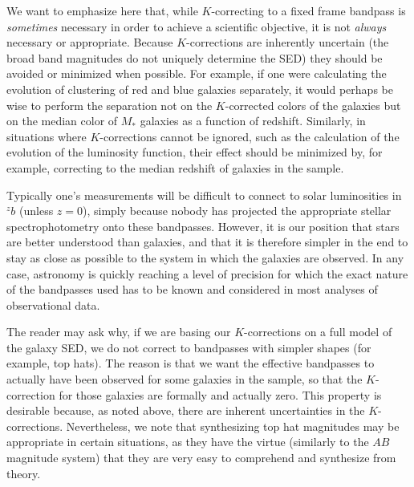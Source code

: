 \documentclass[10pt,preprint]{aastex}
\newcommand{\band}[2]{\ensuremath{^{#1}\!{#2}}}
\begin{document}
We want to emphasize here that, while $K$-correcting to a fixed frame
bandpass is {\it sometimes} necessary in order to achieve a scientific
objective, it is not {\it always} necessary or appropriate. Because
$K$-corrections are inherently uncertain (the broad band magnitudes
do not uniquely determine the SED) they should be avoided or
minimized when possible. For example, if one were calculating the
evolution of clustering of red and blue galaxies separately, it would
perhaps be wise to perform the separation not on the $K$-corrected
colors of the galaxies but on the median color of $M_\ast$
galaxies as a function of redshift. Similarly, in situations where
$K$-corrections cannot be ignored, such as the calculation of the
evolution of the luminosity function, their effect should be minimized
by, for example, correcting to the median redshift of galaxies in the
sample.

Typically one's measurements will be difficult to connect to solar
luminosities in $\band{z}{b}$ (unless $z=0$), simply because nobody
has projected the appropriate stellar spectrophotometry onto these
bandpasses. However, it is our position that stars are better
understood than galaxies, and that it is therefore simpler in the end
to stay as close as possible to the system in which the galaxies are
observed. In any case, astronomy is quickly reaching a level of
precision for which the exact nature of the bandpasses used has to be
known and considered in most analyses of observational data.

The reader may ask why, if we are basing our $K$-corrections on a full
model of the galaxy SED, we do not correct to bandpasses with simpler
shapes (for example, top hats). The reason is that we want the effective
bandpasses to actually have been observed for some galaxies in the
sample, so that the $K$-correction for those galaxies are formally and
actually zero. This property is desirable because, as noted above,
there are inherent uncertainties in the $K$-corrections. Nevertheless,
we note that synthesizing top hat magnitudes may be appropriate in
certain situations, as they have the virtue (similarly to the $AB$
magnitude system) that they are very easy to comprehend and synthesize
from theory.
\end{document}
